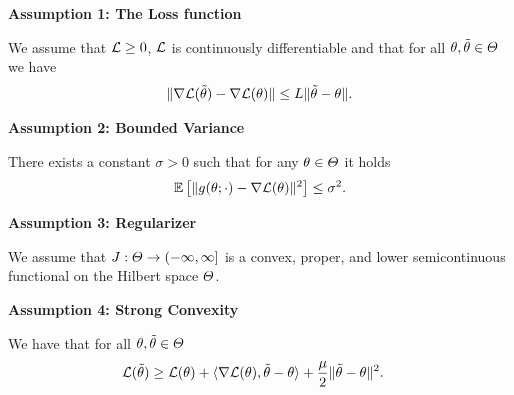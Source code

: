 {{\begin{minipage}[t]{\colwidth}
\begin{minipage}{\textwidth}
\begin{minipage}[t]{.48\textwidth}%
\footnotesize%
\textbf{Assumption 1: The Loss function}

We assume that $\mathcal{L}\geq 0$, $\mathcal{L}$ is continuously differentiable and that for all $\theta,\tilde{\theta}\in\Theta$ we have
\begin{align*}
\Vert\nabla\mathcal{L}(\tilde{\theta})-\nabla\mathcal{L}(\theta)\Vert\leq L \Vert\tilde{\theta}-\theta\Vert.
\end{align*}%
\end{minipage}%
%
\hfill
%
\begin{minipage}[t]{.48\textwidth}%
\footnotesize%
\textbf{Assumption 2: Bounded Variance}


There exists a constant $\sigma>0$ such that for any $\theta\in\Theta$ it holds
\begin{align*}
\mathbb{E}\left[\Vert g(\theta;\cdot)-\nabla\mathcal{L}(\theta)\Vert^2\right] \leq \sigma^2.
\end{align*}%
\end{minipage}%
\end{minipage}%
%
\vspace{.5em}

%
\begin{minipage}{\textwidth}%
\small%
\begin{minipage}[t]{.48\textwidth}%
\footnotesize%
\textbf{Assumption 3: Regularizer}

We assume that $J:\Theta\to(-\infty,\infty]$ is a convex, proper, and lower semicontinuous functional on the Hilbert space $\Theta$.%
\end{minipage}%
%
\hfill%
%
\begin{minipage}[t]{.48\textwidth}%
\footnotesize%
\textbf{Assumption 4: Strong Convexity}

We have that for all $\theta,\tilde{\theta}\in\Theta$
\begin{align*}
\mathcal{L}(\tilde{\theta}) &\geq \mathcal{L}(\theta) + \langle\nabla\mathcal{L}(\theta),\tilde{\theta} - \theta\rangle
+ \frac{\mu}{2}\Vert\tilde{\theta}-\theta\Vert^2.
\end{align*}%
\end{minipage}%
\end{minipage}%
\vspace{66pt}


\end{minipage}}}
